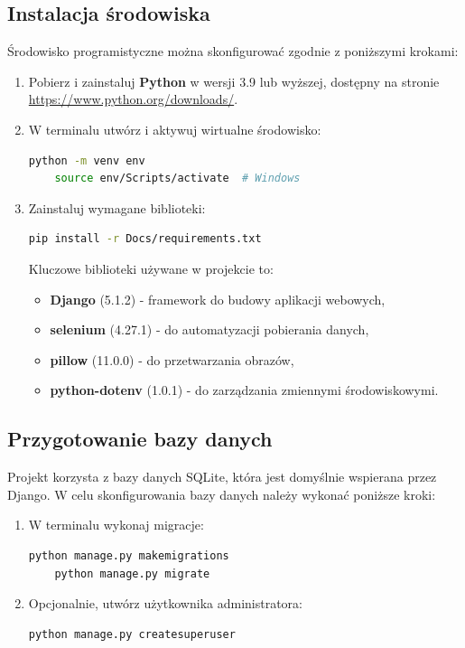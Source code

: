 \documentclass[12pt,a4paper,oneside]{article}
\theoremstyle{definition}
\numberwithin{equation}{section}
\begin{document}
\subsection{Instalacja środowiska}

Środowisko programistyczne można skonfigurować zgodnie z poniższymi krokami:
\begin{enumerate}
    \item Pobierz i zainstaluj \textbf{Python} w wersji 3.9 lub wyższej, dostępny na stronie \url{https://www.python.org/downloads/}.
    \item W terminalu utwórz i aktywuj wirtualne środowisko:
    \begin{lstlisting}[language=bash]
    python -m venv env
    source env/Scripts/activate  # Windows
    \end{lstlisting}
    \item Zainstaluj wymagane biblioteki:
    \begin{lstlisting}[language=bash]
    pip install -r Docs/requirements.txt
    \end{lstlisting}
    Kluczowe biblioteki używane w projekcie to:
    \begin{itemize}
        \item \textbf{Django} (5.1.2) - framework do budowy aplikacji webowych,
        \item \textbf{selenium} (4.27.1) - do automatyzacji pobierania danych,
        \item \textbf{pillow} (11.0.0) - do przetwarzania obrazów,
        \item \textbf{python-dotenv} (1.0.1) - do zarządzania zmiennymi środowiskowymi.
    \end{itemize}
\end{enumerate}

\subsection{Przygotowanie bazy danych}

Projekt korzysta z bazy danych SQLite, która jest domyślnie wspierana przez Django. W celu skonfigurowania bazy danych należy wykonać poniższe kroki:
\begin{enumerate}
    \item W terminalu wykonaj migracje:
    \begin{lstlisting}[language=bash]
    python manage.py makemigrations
    python manage.py migrate
    \end{lstlisting}
    \item Opcjonalnie, utwórz użytkownika administratora:
    \begin{lstlisting}[language=bash]
    python manage.py createsuperuser
    \end{lstlisting}
\end{enumerate}
\end{document}
